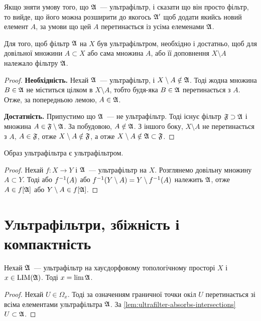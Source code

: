 \begin{remark}
    Якщо зняти умову того, що $\frak A$~--- ультрафільтр, і сказати що він просто фільтр, то вийде, що його можна розширити до якогось $\frak A'$ щоб додати якийсь новий елемент $A$, за умови що цей $A$  перетинається із усіма елеменами $\frak A$.
\end{remark}

\begin{theorem}
    \label{th:ultrafilter-criterion}
    Для того, щоб фільтр $\frak A$ на $X$ був ультрафільтром, необхідно і достатньо, щоб для довільної множини $A \subset X$ або сама множина $A$, або її доповнення $X \setminus A$ належало фільтру $\frak A$.
\end{theorem}
\begin{proof}
    \textbf{Необхідність.} Нехай $\frak A$~--- ультрафільтр, і $X \setminus A \notin \frak A$. Тоді жодна множина $B \in \frak A$ не міститься цілком в $X \setminus A$, тобто будя-яка $B \in \frak A$ перетинається з $A$. Отже, за попередньою лемою, $A \in \frak A$. \medskip
    
    \textbf{Достатність.} Припустимо що $\frak A$~--- не ультрафільтр. Тоді існує фільтр $\frak F \supset \frak A$ і множина $A \in \frak F \setminus \frak A$. За побудовою, $A \notin \frak A$. З іншого боку, $X \setminus A$ не перетинається з $A$, $A \in \frak F$, отже $X \setminus A \notin \frak F$, а отже $X \setminus A \notin \frak A \subset \frak F$.
\end{proof}

\begin{corollary}
    \label{crl:ultrafilter-image-is-ultrafilter}
    Образ ультрафільтра є ультрафільтром.
\end{corollary}
\begin{proof}
    Нехай $f: X \to Y$ і $\frak A$~--- ультрафільтр на $X$. Розглянемо довільну множину $A \subset Y$. Тоді або $f\inv (A)$ або $f\inv (Y \setminus A) = Y \setminus f\inv (A)$ належить $\frak A$, отже $A \in f[\frak A]$ або $Y \setminus A \in f[\frak A]$.
\end{proof}

\section{Ультрафільтри, збіжність і компактність}

\begin{lemma}
    \label{lem:ultrafilter-limitpoint-is-its-limit}
    Нехай $\frak A$~--- ультрафільтр на хаусдорфовому топологічному просторі $X$ і $x \in \LIM(\frak A)$. Тоді $x = \lim \frak A$.
\end{lemma}
\begin{proof}
    Нехай $U \in \Omega_x$. Тоді за означенням граничної точки окіл $U$ перетинається зі всіма елементами ультрафільтра $\frak A$. За \cref{lem:ultrafilter-absorbs-intersections} $U \subset \frak A$.
\end{proof}

